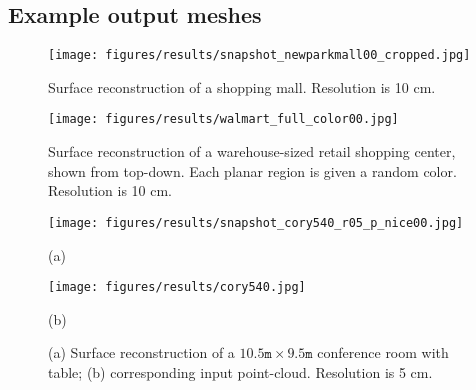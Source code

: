 \documentclass[10pt,twocolumn,letterpaper]{article}
\begin{document}
\subsection{Example output meshes}
\label{sec:examples}


\begin{figure}[t]
	\begin{minipage}[b]{0.98\linewidth}
	\centerline{\texttt{[image: figures/results/snapshot\_newparkmall00\_cropped.jpg]}}
	\end{minipage}
	\caption{Surface reconstruction of a shopping mall.  Resolution is 10 cm.}
	\label{fig:newparkmall}
\end{figure}

\begin{figure}[t]
	\begin{minipage}[b]{0.98\linewidth}
	\centerline{\texttt{[image: figures/results/walmart\_full\_color00.jpg]}}
	\end{minipage}
	\caption{Surface reconstruction of a warehouse-sized retail shopping center, shown from top-down.  Each planar region is given a random color.  Resolution is 10 cm.}
	\label{fig:walmart}
\end{figure}

\begin{figure}[t]
	\begin{minipage}[b]{0.48\linewidth}
	\centerline{\texttt{[image: figures/results/snapshot\_cory540\_r05\_p\_nice00.jpg]}}
	\centerline{(a)}\medskip
	\end{minipage}
	\hfill
	\begin{minipage}[b]{0.48\linewidth}
	\centerline{\texttt{[image: figures/results/cory540.jpg]}}
	\centerline{(b)}\medskip
	\end{minipage}
	\caption{(a) Surface reconstruction of a $10.5 \texttt{m} \times 9.5 \texttt{m}$ conference room with table; (b) corresponding input point-cloud.  Resolution is 5 cm.}
	\label{fig:cory540}
\end{figure}
\end{document}
